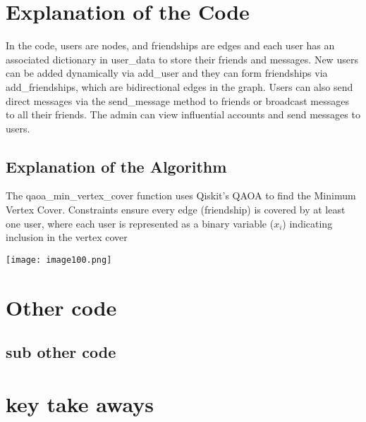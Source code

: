 \documentclass[8pt]{article}
\newenvironment{Figure}
  {\par\medskip\noindent\minipage{\linewidth}}
  {\endminipage\par\medskip}
\begin{document}
\begin{multicols}{2}
\section{Explanation of the Code}
In the code, users are nodes, and friendships are edges and each user has an associated dictionary in user_data to store their friends and messages. 
New users can be added dynamically via add_user and they can form friendships via add_friendships, which are bidirectional edges in the graph. Users can also send direct messages via the send_message method to friends or broadcast messages to all their friends.
The admin can view influential accounts and send messages to users.

\subsection{Explanation of the Algorithm}
The qaoa_min_vertex_cover function uses Qiskit's QAOA to find the Minimum Vertex Cover. Constraints ensure every edge (friendship) is covered by at least one user, where each user is represented as a binary variable ($x_i$) indicating inclusion in the vertex cover

\begin{Figure}
 \centering
 \texttt{[image: image100.png]}
\end{Figure}

\section{Other code}
\subsection{sub other code}

\section{key take aways}
\end{multicols}
\end{document}
